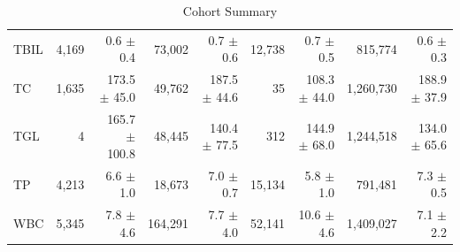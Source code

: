 \begin{table}[ht]
\begin{tabular}{lrrrrrrrr}
TBIL & 4,169 & 0.6 $\pm$ 0.4 & 73,002 & 0.7 $\pm$ 0.6 & 12,738 & 0.7 $\pm$ 0.5 & 815,774 & 0.6 $\pm$ 0.3 \\
TC & 1,635 & 173.5 $\pm$ 45.0 & 49,762 & 187.5 $\pm$ 44.6 & 35 & 108.3 $\pm$ 44.0 & 1,260,730 & 188.9 $\pm$ 37.9 \\
TGL & 4 & 165.7 $\pm$ 100.8 & 48,445 & 140.4 $\pm$ 77.5 & 312 & 144.9 $\pm$ 68.0 & 1,244,518 & 134.0 $\pm$ 65.6 \\
TP & 4,213 & 6.6 $\pm$ 1.0 & 18,673 & 7.0 $\pm$ 0.7 & 15,134 & 5.8 $\pm$ 1.0 & 791,481 & 7.3 $\pm$ 0.5 \\
WBC & 5,345 & 7.8 $\pm$ 4.6 & 164,291 & 7.7 $\pm$ 4.0 & 52,141 & 10.6 $\pm$ 4.6 & 1,409,027 & 7.1 $\pm$ 2.2 \\
\bottomrule
\end{tabular}
\caption{Cohort Summary}
\label{tab:cohort_summary}
\end{table}